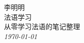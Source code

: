 \begin{titlepage}
  \raggedleft
      {\Large 李明明\\[1in] }
  {\Huge\scshape 法语学习\\[.2in]}
  {\large 从零学习法语的笔记整理 \\}
  \vfill
  {\itshape \today{}}
\end{titlepage}

